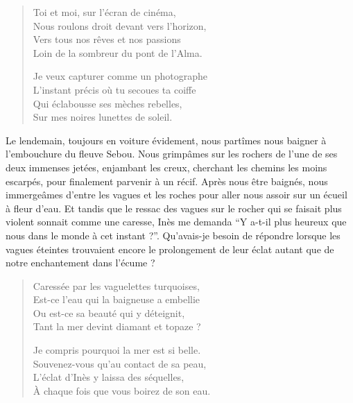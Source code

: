 \begin{verse}%
  \quatrain%
  Toi et moi, sur l’écran de cinéma,\\  %
  Nous roulons droit devant vers l’horizon,\\  %
  Vers tous nos rêves et nos passions\\  %
  Loin de la sombreur du pont de l’Alma.

  Je veux capturer comme un photographe\\  %
  L’instant précis où tu secoues ta coiffe\\  %
  Qui éclabousse ses mèches rebelles,\\  %
  Sur mes noires lunettes de soleil.
\end{verse}

\begin{prose}
  Le lendemain, toujours en voiture évidement, nous partîmes nous baigner à l’embouchure du fleuve Sebou. Nous grimpâmes  sur les rochers de l’une de ses deux immenses jetées, enjambant les creux, cherchant les chemins les moins escarpés, pour finalement parvenir à un récif. Après nous être baignés, nous immergeâmes d’entre les vagues et les roches pour aller nous assoir sur un écueil à fleur d’eau. Et tandis que le ressac des vagues sur le rocher qui se faisait plus violent sonnait comme une caresse, Inès me demanda \enquote{Y a-t-il plus heureux que nous dans le monde à cet instant ?}. Qu’avais-je besoin de  répondre lorsque les vagues éteintes trouvaient encore le prolongement de leur éclat autant que de notre enchantement dans l’écume ?
\end{prose}

\begin{verse}%
  \quatrain%
  Caressée par les vaguelettes turquoises,\\  %
  Est-ce l’eau qui la baigneuse a embellie\\  %
  Ou est-ce sa beauté qui y déteignit,\\  %
  Tant la mer devint diamant et topaze ?

  Je compris pourquoi la mer est si belle.\\  %
  Souvenez-vous qu’au contact de sa peau,\\  %
  L’éclat d’Inès y laissa des séquelles,\\  %
  À chaque fois que vous boirez de son eau.
\end{verse}

